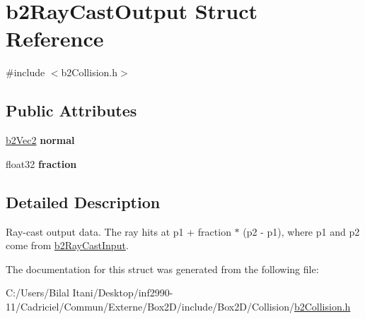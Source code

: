 \hypertarget{structb2_ray_cast_output}{}\section{b2\+Ray\+Cast\+Output Struct Reference}
\label{structb2_ray_cast_output}


{\ttfamily \#include $<$b2\+Collision.\+h$>$}

\subsection*{Public Attributes}
\begin{DoxyCompactItemize}
\item 
\hyperlink{structb2_vec2}{b2\+Vec2} {\bfseries normal}\hypertarget{structb2_ray_cast_output_aa9bbfe75afa23c21e85cb1bd3736529b}{}\label{structb2_ray_cast_output_aa9bbfe75afa23c21e85cb1bd3736529b}

\item 
float32 {\bfseries fraction}\hypertarget{structb2_ray_cast_output_a191c69bb399304bfe30c69e2158b3f29}{}\label{structb2_ray_cast_output_a191c69bb399304bfe30c69e2158b3f29}

\end{DoxyCompactItemize}


\subsection{Detailed Description}
Ray-\/cast output data. The ray hits at p1 + fraction $\ast$ (p2 -\/ p1), where p1 and p2 come from \hyperlink{structb2_ray_cast_input}{b2\+Ray\+Cast\+Input}. 

The documentation for this struct was generated from the following file\+:\begin{DoxyCompactItemize}
\item 
C\+:/\+Users/\+Bilal Itani/\+Desktop/inf2990-\/11/\+Cadriciel/\+Commun/\+Externe/\+Box2\+D/include/\+Box2\+D/\+Collision/\hyperlink{b2_collision_8h}{b2\+Collision.\+h}\end{DoxyCompactItemize}
